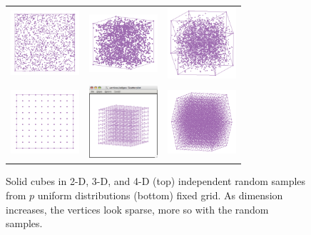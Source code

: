 \begin{figure}[ht]
\centering
\begin{tabular}{c c c}
\includegraphics[width=1in]{fig/cube-2-solid.pdf} & \includegraphics[width=1in]{fig/cube-3-solid.pdf} & \includegraphics[width=1in]{fig/cube-4-solid.pdf} \\
\includegraphics[width=1in]{fig/cube-2-solideq-9.pdf} & \includegraphics[width=1in]{fig/cube-3-solideq-9.pdf} & \includegraphics[width=1in]{fig/cube-4-solideq-9.pdf}
\end{tabular}
\caption{Solid cubes in 2-D, 3-D, and 4-D (top) independent random samples from
  $p$ uniform distributions (bottom) fixed grid. As dimension increases, the vertices look sparse, more so with the random samples. }
\label{solcube}
\end{figure}

